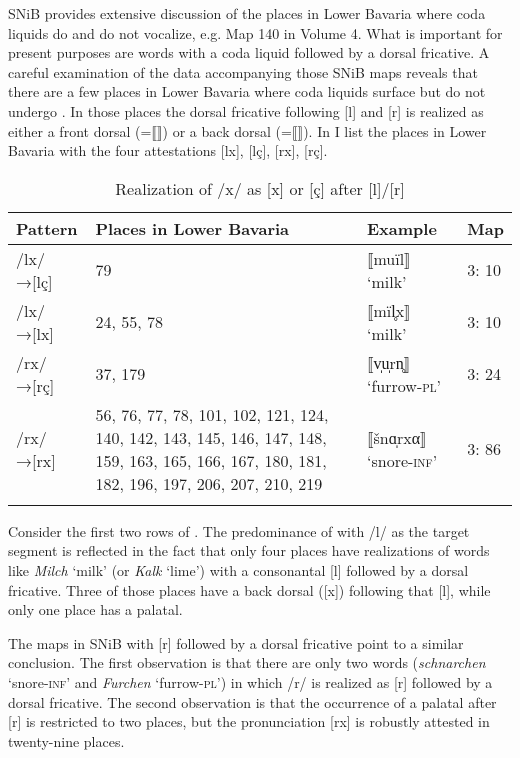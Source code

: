 SNiB provides extensive discussion of the places in Lower Bavaria where coda liquids do and do not vocalize, e.g. Map 140 in Volume 4. What is important for present purposes are words with a coda liquid followed by a dorsal fricative. A careful examination of the data accompanying those SNiB maps reveals that there are a few places in Lower Bavaria where coda liquids surface but do not undergo . In those places the dorsal fricative following [l] and [r] is realized as either a front dorsal (=⟦⟧) or a back dorsal (=⟦⟧). In  I list the places in Lower Bavaria with the four attestations [lx], [lç], [rx], [rç].\largerpage

\begin{table}
\caption{\label{tab:13.6}Realization of /x/ as [x] or [ç] after [l]/[r]}
\begin{tabularx}{\textwidth}{lQll}
\lsptoprule
Pattern & Places in Lower Bavaria & Example & Map\\\midrule
/lx/→[lç] & 79 & ⟦muïl⟧ ‘milk’ & 3: 10\\
/lx/→[lx] & 24, 55, 78 & ⟦mïl̥x⟧ ‘milk’ & 3: 10\\
/rx/→[rç] & 37, 179 & ⟦v̩u̩rn̥⟧ ‘furrow-\textsc{pl}' & 3: 24 \\
/rx/→[rx] & 56, 76, 77, 78, 101, 102, 121, 124, 140, 142, 143, 145, 146, 147, 148, 159, 163, 165, 166, 167, 180, 
181, 182, 196, 197, 206, 207, 210, 219 & ⟦šnɑ̩rxα⟧ ‘snore-\textsc{inf}’ & 3: 86 \\
\lspbottomrule
\end{tabularx}
\end{table}

Consider the first two rows of .  The predominance of  with /l/ as the target segment is reflected in the fact that only four places have realizations of words like \textit{Milch} ‘milk’ (or \textit{Kalk} ‘lime’) with a consonantal [l] followed by a dorsal fricative. Three of those places have a back dorsal ([x]) following that [l], while only one place has a palatal.

The maps in SNiB with [r] followed by a dorsal fricative point to a similar conclusion. The first observation is that there are only two words (\textit{schnarchen} ‘snore-\textsc{inf}’ and \textit{Furchen} ‘furrow-\textsc{pl}’) in which /r/ is realized as [r] followed by a dorsal fricative. The second observation is that the occurrence of a palatal after [r] is restricted to two places, but the pronunciation [rx] is robustly attested in twenty-nine places.

